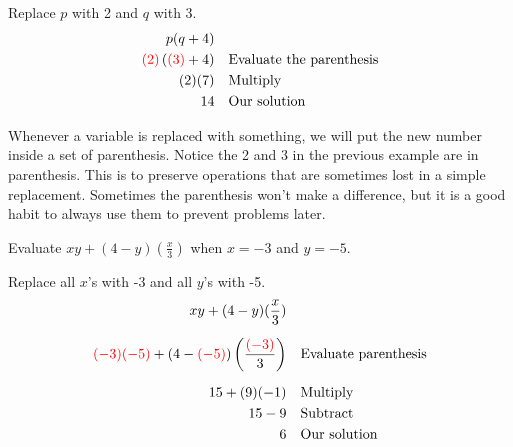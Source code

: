 Replace $p$ with 2 and $q$ with 3.
\begin{align*}
		p(q+4)& &&\\	
		\textcolor{red}{(2)}\left(\textcolor{red}{(3)}+4\right)&	&&\text{Evaluate the parenthesis} \\
		(2)(7)&	&&\text{Multiply}\\
		14&	&&\text{Our solution}
\end{align*}
\begin{nt}
	Whenever a variable is replaced with something, we will put the new number inside a set of parenthesis. Notice the 2 and 3 in the previous example are in parenthesis. This is to preserve operations that are sometimes lost in a simple replacement. Sometimes the parenthesis won’t make a difference, but it is a good habit to always use them to prevent problems later.
\end{nt}
\newpage
\begin{exa}
	Evaluate $\displaystyle xy+(4-y)(\frac{x}{3})$ when $x=-3$ and $y=-5$.
\end{exa}
Replace all $x$'s with -3 and all $y$'s with -5.
\begin{align*}
	xy+(4-y)(\frac{x}{3})&	&&\\[.2cm]
	\textcolor{red}{(-3)(-5)}+\left(4-\textcolor{red}{(-5)}\right)\left(\frac{\textcolor{red}{(-3)}}{3}\right)&	
				&&\text{Evaluate parenthesis}\\[.2cm]
	15+(9)(-1)&	&&\text{Multiply}\\
	15 -9&	&&\text{Subtract} \\
	6&	&&\text{Our solution}
\end{align*}
